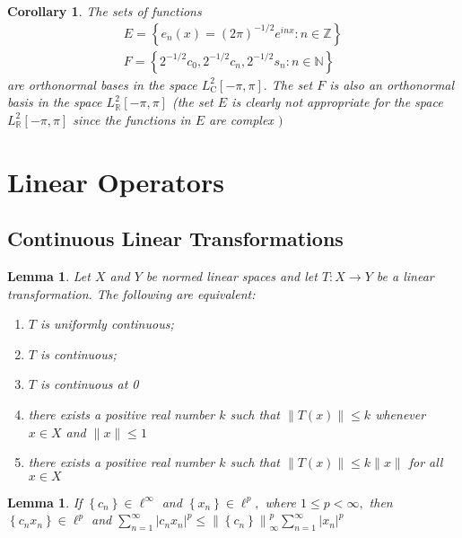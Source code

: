 \documentclass[10pt]{paper}
\newtheorem{corollary}{Corollary}[section]
\newtheorem{lemma}[theorem]{Lemma}
\begin{document}
\begin{corollary}
    The sets of functions
    $$
        \begin{array}{l}
            E=\left\{e_{n}(x)=(2 \pi)^{-1 / 2} e^{i n x}: n \in \mathbb{Z}\right\} \\
            F=\left\{2^{-1 / 2} c_{0}, 2^{-1 / 2} c_{n}, 2^{-1 / 2} s_{n}: n \in \mathbb{N}\right\}
        \end{array}
    $$
    are orthonormal bases in the space $L_{\mathrm{C}}^{2}[-\pi, \pi] .$ The set $F$ is also an orthonormal basis in the space $L_{\mathbb{R}}^{2}[-\pi, \pi]$ (the set $E$ is clearly not appropriate for the space $L_{\mathbb{R}}^{2}[-\pi, \pi]$ since the functions in $E$ are complex $)$
\end{corollary}

\section{Linear Operators}
\subsection{Continuous Linear Transformations}

\begin{lemma}
    Let $X$ and $Y$ be normed linear spaces and let $T: X \rightarrow Y$ be a linear transformation. The following are equivalent:
    \begin{enumerate}
        \item $T$ is uniformly continuous;
        \item $T$ is continuous;
        \item $T$ is continuous at 0
        \item there exists a positive real number $k$ such that $\|T(x)\| \leq k$ whenever $x \in X$ and $\|x\| \leq 1$
        \item there exists a positive real number $k$ such that $\|T(x)\| \leq k\|x\|$ for all $x \in X$
    \end{enumerate}
\end{lemma}

\begin{lemma}
    If $\left\{c_{n}\right\} \in \ell^{\infty}$ and $\left\{x_{n}\right\} \in \ell^{p},$ where $1 \leq p<\infty,$ then $\left\{c_{n} x_{n}\right\} \in \ell^{p}$ and $ \sum_{n=1}^{\infty}\left|c_{n} x_{n}\right|^{p} \leq\left\|\left\{c_{n}\right\}\right\|_{\infty}^{p} \sum_{n=1}^{\infty}\left|x_{n}\right|^{p}$
\end{lemma}
\end{document}
